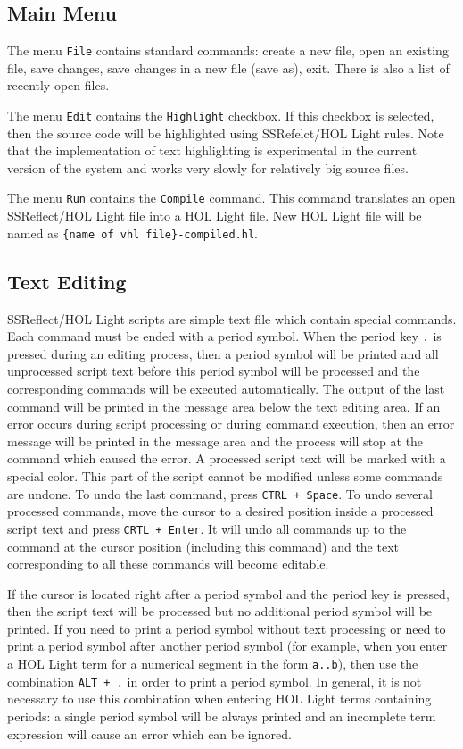 \documentclass[a4paper]{article}
\begin{document}
\subsection{Main Menu}
The menu {\tt File} contains standard commands: create a new file, open an existing file, save changes, save changes in a new file (save as), exit. There is also a list of recently open files.

The menu {\tt Edit} contains the {\tt Highlight} checkbox. If this checkbox is selected, then the source code will be highlighted using SSRefelct/HOL Light rules. Note that the implementation of text highlighting is experimental in the current version of the system and works very slowly for relatively big source files.

The menu {\tt Run} contains the {\tt Compile} command. This command translates an open SSReflect/HOL Light file into a HOL Light file. New HOL Light file will be named as {\tt\{name of vhl file\}-compiled.hl}.

\subsection{Text Editing}
SSReflect/HOL Light scripts are simple text file which contain special commands. Each command must be ended with a period symbol. When the period key \verb|.| is pressed during an editing process, then a period symbol will be printed and all unprocessed script text before this period symbol will be processed and the corresponding commands will be executed automatically. The output of the last command will be printed in the message area below the text editing area. If an error occurs during script processing or during command execution, then an error message will be printed in the message area and the process will stop at the command which caused the error. A processed script text will be marked with a special color. This part of the script cannot be modified unless some commands are undone. To undo the last command, press \verb|CTRL + Space|.
To undo several processed commands, move the cursor to a desired position inside a processed script text and press \verb|CRTL + Enter|. It will undo all commands up to the command at the cursor position (including this command) and the text corresponding to all these commands will become editable.

If the cursor is located right after a period symbol and the period key is pressed, then the script text will be processed but no additional period symbol will be printed. If you need to print a period symbol without text processing or need to print a period symbol after another period symbol (for example, when you enter a HOL Light term for a numerical segment in the form \verb|a..b|), then use the combination \verb|ALT + .| in order to print a period symbol. In general, it is not necessary to use this combination when entering HOL Light terms containing periods: a single period symbol will be always printed and an incomplete term expression will cause an error which can be ignored.
\end{document}
